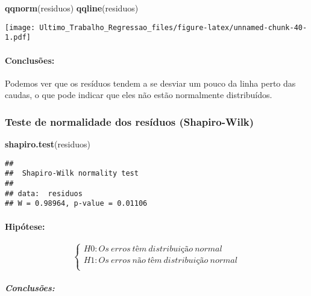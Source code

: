 \documentclass[
]{article}
\newenvironment{Shaded}{\begin{snugshade}}{\end{snugshade}}
\newcommand{\FunctionTok}[1]{\textcolor[rgb]{0.13,0.29,0.53}{\textbf{#1}}}
\newcommand{\NormalTok}[1]{#1}
\begin{document}
\begin{Shaded}
\begin{Highlighting}[]
\FunctionTok{qqnorm}\NormalTok{(residuos)}
\FunctionTok{qqline}\NormalTok{(residuos) }
\end{Highlighting}
\end{Shaded}

\texttt{[image: Ultimo\_Trabalho\_Regressao\_files/figure-latex/unnamed-chunk-40-1.pdf]}

\hypertarget{conclusuxf5es-4}{%
\paragraph{Conclusões:}\label{conclusuxf5es-4}}

Podemos ver que os resíduos tendem a se desviar um pouco da linha perto
das caudas, o que pode indicar que eles não estão normalmente
distribuídos.

\hypertarget{teste-de-normalidade-dos-resuxedduos-shapiro-wilk}{%
\subsubsection{Teste de normalidade dos resíduos
(Shapiro-Wilk)}\label{teste-de-normalidade-dos-resuxedduos-shapiro-wilk}}

\begin{Shaded}
\begin{Highlighting}[]
\FunctionTok{shapiro.test}\NormalTok{(residuos)}
\end{Highlighting}
\end{Shaded}

\begin{verbatim}
## 
##  Shapiro-Wilk normality test
## 
## data:  residuos
## W = 0.98964, p-value = 0.01106
\end{verbatim}

\hypertarget{hipuxf3tese-5}{%
\paragraph{Hipótese:}\label{hipuxf3tese-5}}

\[
\left\{ \begin{array}{rc} 
H0: Os \ erros \ têm \ distribuição \ normal \\ 
H1: Os \ erros \ não \ têm \ distribuição \ normal \\ 
\end{array}\right.
\]

\hypertarget{conclusuxf5es-5}{%
\subparagraph{Conclusões:}\label{conclusuxf5es-5}}
\end{document}
